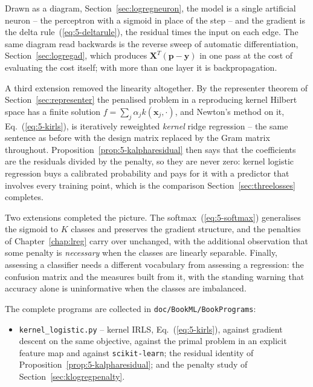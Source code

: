 Drawn as a diagram, Section~\ref{sec:logregneuron}, the model is a single
artificial neuron -- the perceptron with a sigmoid in place of the step --
and the gradient is the delta rule~(\ref{eq:5-deltarule}), the residual
times the input on each edge.  The same diagram read backwards is the
reverse sweep of automatic differentiation, Section~\ref{sec:logregad},
which produces $\bm{X}^{T}(\bm{p}-\bm{y})$ in one pass at the cost of
evaluating the cost itself; with more than one layer it is
backpropagation.

A third extension removed the linearity altogether.  By the representer
theorem of Section~\ref{sec:representer} the penalised problem in a
reproducing kernel Hilbert space has a finite solution
$f=\sum_j\alpha_jk(\bm{x}_j,\cdot)$, and Newton's method on it,
Eq.~(\ref{eq:5-kirls}), is iteratively reweighted \emph{kernel} ridge
regression -- the same sentence as before with the design matrix replaced by
the Gram matrix throughout.  Proposition~\ref{prop:5-kalpharesidual} then says
that the coefficients are the residuals divided by the penalty, so they are
never zero: kernel logistic regression buys a calibrated probability and pays
for it with a predictor that involves every training point, which is the
comparison Section~\ref{sec:threelosses} completes.

Two extensions completed the picture.  The softmax~(\ref{eq:5-softmax})
generalises the sigmoid to $K$ classes and preserves the gradient structure,
and the penalties of Chapter~\ref{chap:lreg} carry over unchanged, with the
additional observation that some penalty is \emph{necessary} when the classes
are linearly separable.  Finally, assessing a classifier needs a different
vocabulary from assessing a regression: the confusion matrix and the measures
built from it, with the standing warning that accuracy alone is uninformative
when the classes are imbalanced.

The complete programs are collected in \texttt{doc/BookML/BookPrograms}:

\begin{itemize}
  \item \texttt{kernel\_logistic.py} -- kernel IRLS, Eq.~(\ref{eq:5-kirls}),
        against gradient descent on the same objective, against the primal
        problem in an explicit feature map and against \texttt{scikit-learn};
        the residual identity of
        Proposition~\ref{prop:5-kalpharesidual}; and the penalty study of
        Section~\ref{sec:klogregpenalty}.
\end{itemize}


